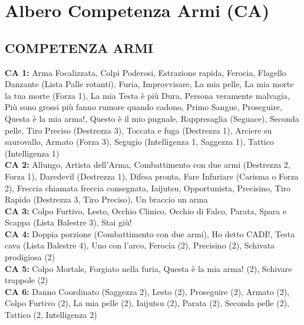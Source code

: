 	\section{Albero Competenza Armi (CA)}


	\begin{multicols}{2}
	\small

	\subsection{COMPETENZA ARMI}

	\textbf{CA 1:} Arma Focalizzata, Colpi Poderosi, Estrazione rapida, Ferocia, Flagello Danzante (Lista Palle rotanti), Furia, Improvvisare, La mia pelle, La mia morte la tua morte (Forza 1), La mia Testa è più Dura, Persona veramente malvagia, Più sono grossi più fanno rumore quando cadono, Primo Sangue, Proseguire, Questa è la mia arma!, Questo è il mio pugnale, Rappresaglia (Seguace), Seconda pelle, Tiro Preciso (Destrezza 3), Toccata e fuga (Destrezza 1), Arciere su saurovallo, Armato (Forza 3), Segugio (Intelligenza 1, Saggezza 1), Tattico (Intelligenza 1)\\

	\textbf{CA 2:} Allungo, Artista dell'Arma, Combattimento con due armi (Destrezza 2, Forza 1), Daredevil (Destrezza 1), Difesa pronta, Fare Infuriare (Carisma o Forza 2), Freccia chiamata freccia consegnata, Iaijutsu, Opportunista, Precisino, Tiro Rapido (Destrezza 3, Tiro Preciso), Un braccio un arma\\

	\textbf{CA 3:} Colpo Furtivo, Lesto, Occhio Clinico, Occhio di Falco, Parata, Spara e Scappa (Lista Balestre 3), Stai giù!\\

	\textbf{CA 4:} Doppia porzione (Combattimento con due armi), Ho detto CADI!, Testa cava (Lista Balestre 4), Uno con l'arco, Ferocia (2), Precisino (2), Schivata prodigiosa (2)\\

	\textbf{CA 5:} Colpo Mortale, Forgiato nella furia, Questa è la mia arma! (2), Schivare trappole (2)\\

	\textbf{CA 6:} Danno Coordinato (Saggezza 2), Lesto (2), Proseguire (2), Armato (2), Colpo Furtivo (2), La mia pelle (2), Iaijutsu (2), Parata (2), Seconda pelle (2), Tattico (2, Intelligenza 2)\\


\end{multicols}
